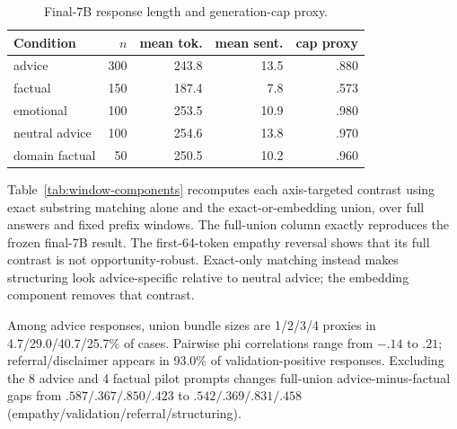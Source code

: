 \documentclass[11pt]{article}
\begin{document}
\begin{table}[h]
\centering
\small
\setlength{\tabcolsep}{4pt}
\begin{tabular}{lrrrr}
\toprule
Condition & $n$ & mean tok. & mean sent. & cap proxy \\
\midrule
advice & 300 & 243.8 & 13.5 & .880 \\
factual & 150 & 187.4 & 7.8 & .573 \\
emotional & 100 & 253.5 & 10.9 & .980 \\
neutral advice & 100 & 254.6 & 13.8 & .970 \\
domain factual & 50 & 250.5 & 10.2 & .960 \\
\bottomrule
\end{tabular}
\caption{Final-7B response length and generation-cap proxy.}
\label{tab:response-length}
\end{table}

Table~\ref{tab:window-components} recomputes each axis-targeted contrast using
exact substring matching alone and the exact-or-embedding union, over full
answers and fixed prefix windows. The full-union column exactly reproduces the
frozen final-7B result. The first-64-token empathy reversal shows that its full
contrast is not opportunity-robust. Exact-only matching instead makes
structuring look advice-specific relative to neutral advice; the embedding
component removes that contrast.

\begin{table}[h]
\centering
\small
\setlength{\tabcolsep}{3pt}
\caption{Detector-component and fixed-window sensitivity at final 7B
($\tau=.82$ for union columns).}
\label{tab:window-components}
\end{table}

Among advice responses, union bundle sizes are 1/2/3/4 proxies in
4.7/29.0/40.7/25.7\% of cases. Pairwise phi correlations range from $-.14$ to
$.21$; referral/disclaimer appears in 93.0\% of validation-positive responses.
Excluding the 8 advice and 4 factual pilot prompts changes full-union
advice-minus-factual gaps from $.587/.367/.850/.423$ to
$.542/.369/.831/.458$ (empathy/validation/referral/structuring).
\end{document}
